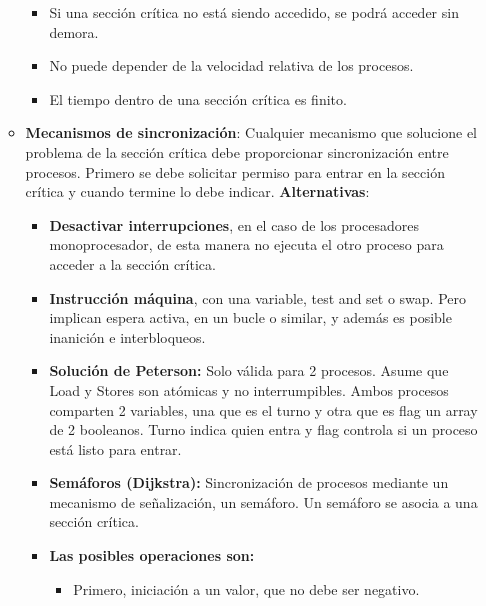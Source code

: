 \documentclass[12pt, twoside, openright]{report} %
\begin{document}
\begin{itemize}
\begin{itemize}
\begin{itemize}
      \item Si una sección crítica no está siendo accedido, se podrá acceder
        sin demora.
        
      \item No puede depender de la velocidad relativa de los procesos.
        
      \item El tiempo dentro de una sección crítica es finito.
        
      \end{itemize}
    \item \textbf{Mecanismos de sincronización}: Cualquier mecanismo que
      solucione el problema de la sección crítica debe proporcionar
      sincronización entre procesos. Primero se debe solicitar permiso
      para entrar en la sección crítica y cuando termine lo debe
      indicar. \textbf{Alternativas}:
      

      \begin{itemize}
      \item \textbf{Desactivar interrupciones}, en el caso de los
        procesadores monoprocesador, de esta manera no ejecuta el otro
        proceso para acceder a la sección crítica.
        
      \item \textbf{Instrucción máquina}, con una variable, test and set o
        swap. Pero implican espera activa, en un bucle o similar, y
        además es posible inanición e interbloqueos.
        
      \item \textbf{Solución de Peterson:} Solo válida para 2 procesos.
        Asume que Load y Stores son atómicas y no interrumpibles. Ambos
        procesos comparten 2 variables, una que es el turno y otra que
        es flag un array de 2 booleanos. Turno indica quien entra y flag
        controla si un proceso está listo para entrar.
        
      \item \textbf{Semáforos (Dijkstra):} Sincronización de procesos
        mediante un mecanismo de señalización, un semáforo. Un semáforo
        se asocia a una sección crítica.
        
      \item \textbf{Las posibles operaciones son:}
        

        \begin{itemize}
        \item Primero, iniciación a un valor, que no debe ser negativo.
          

\end{itemize}
\end{itemize}
\end{itemize}
\end{itemize}
\end{document}
